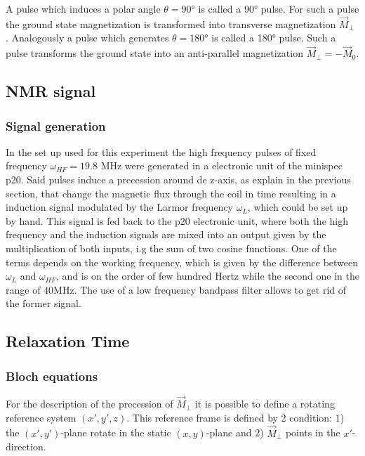 A pulse which induces a  polar angle $\theta = 90$° is called a 90° pulse. For such a pulse the ground state magnetization is transformed into transverse magnetization $\vec{M}_{\perp}$ %
. Analogously a pulse which generates $\theta = 180°$ is called a 180° pulse. Such a pulse transforms the ground state into an anti-parallel magnetization $\vec{M}_{\perp} = -\vec{M}_0$. %
\subsection{NMR signal}
\subsubsection{Signal generation}
In the set up used for this experiment the high frequency pulses of fixed frequency $\omega_{HF} = 19.8$ MHz were generated in a electronic unit of the minispec p20. Said pulses induce a precession around de z-axis, as explain in the previous section, that change the magnetic flux through the coil in time resulting in a induction signal modulated by the Larmor frequency $\omega_L$, which could be set up by hand. This signal is fed back to the p20 electronic unit, where both the high frequency and the induction signals are mixed into an output given by the multiplication of both inputs, i.g the sum of two cosine functions. One of the terms depends on the working frequency, which is given by the difference between $\omega_L$ and $\omega_{HF}$, and is on the order of few hundred Hertz while the second one in the range of 40MHz. The use of a low frequency bandpass filter allows to get rid of the former signal.   
\subsection{Relaxation Time}
\subsubsection{Bloch equations}
For the description of the precession of $\vec{M}_{\perp}$ it is possible to define a rotating reference system $(x', y', z)$. This reference frame is defined by 2 condition: 1) the $(x', y')$-plane rotate in the static $(x, y)$-plane and 2) $\vec{M}_{\perp}$ points in the $x'$-direction.

